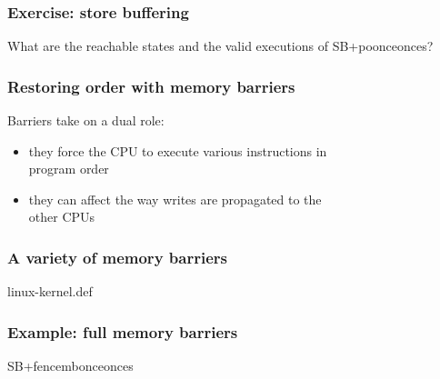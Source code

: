 \documentclass[usenames,dvipsnames]{beamer}
\begin{document}
\begin{frame}[fragile]
\frametitle{Exercise: store buffering}


What are the reachable states and the valid executions of SB+poonceonces?

\end{frame}


\begin{frame}[fragile]
\frametitle{Restoring order with memory barriers}

Barriers take on a dual role:
\vspace{1mm}
\begin{itemize}
	\item they force the CPU to execute various instructions in \\
	program order
\vspace{2mm}
	\item they can affect the way writes are propagated to the
	\\ other CPUs
\end{itemize}

\end{frame}


\begin{frame}[fragile]
\frametitle{A variety of memory barriers}

\begin{center}
linux-kernel.def
\end{center}

\end{frame}


\begin{frame}[fragile]
\frametitle{Example: full memory barriers}

\begin{center}
SB+fencembonceonces
\end{center}

\end{frame}
\end{document}
